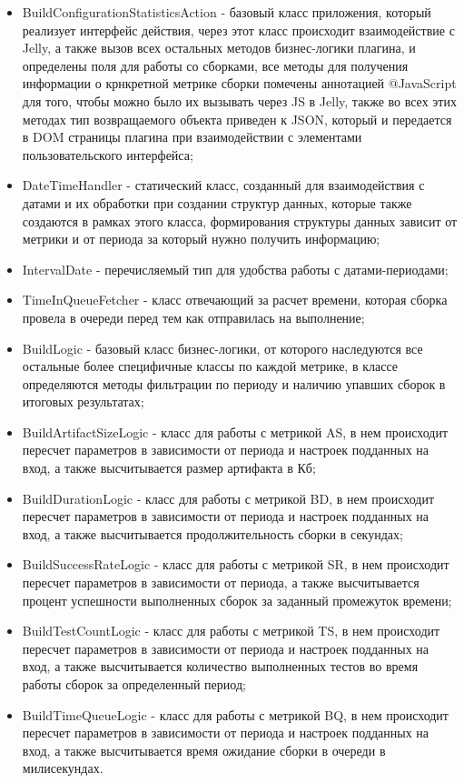 \begin{itemize}
	\item BuildConfigurationStatisticsAction - базовый класс приложения, который реализует интерфейс действия, через этот класс происходит взаимодействие с Jelly, а также вызов всех остальных методов бизнес-логики плагина, и определены поля для работы со сборками, все методы для получения информации о крнкретной метрике сборки помечены аннотацией @JavaScript для того, чтобы можно было их вызывать через JS в Jelly, также во всех этих методах тип возвращаемого объекта приведен к JSON, который и передается в DOM страницы плагина при взаимодействии с элементами пользовательского интерфейса;
	\item DateTimeHandler - статический класс, созданный для взаимодействия с датами и их обработки при создании структур данных, которые также создаются в рамках этого класса, формирования структуры данных зависит от метрики и от периода за который нужно получить информацию;
	\item IntervalDate - перечисляемый тип для удобства работы с датами-периодами;
	\item TimeInQueueFetcher - класс отвечающий за расчет времени, которая сборка провела в очереди перед тем как отправилась на выполнение;
	\item BuildLogic - базовый класс бизнес-логики, от которого наследуются все остальные более специфичные классы по каждой метрике, в классе определяются методы фильтрации по периоду и наличию упавших сборок в итоговых результатах;
	\item BuildArtifactSizeLogic - класс для работы с метрикой AS, в нем происходит пересчет параметров в зависимости от периода и настроек подданных на вход, а также высчитывается размер артифакта в Кб;
	\item BuildDurationLogic - класс для работы с метрикой BD, в нем происходит пересчет параметров в зависимости от периода и настроек подданных на вход, а также высчитывается продолжительность сборки в секундах;
	\item BuildSuccessRateLogic - класс для работы с метрикой SR, в нем происходит пересчет параметров в зависимости от периода, а также высчитывается процент успешности выполненных сборок за заданный промежуток времени;
	\item BuildTestCountLogic - класс для работы с метрикой TS, в нем происходит пересчет параметров в зависимости от периода и настроек подданных на вход, а также высчитывается количество выполненных тестов во время работы сборок за определенный период;
	\item BuildTimeQueueLogic - класс для работы с метрикой BQ, в нем происходит пересчет параметров в зависимости от периода и настроек подданных на вход, а также высчитывается время ожидание сборки в очереди в милисекундах.
\end{itemize}

